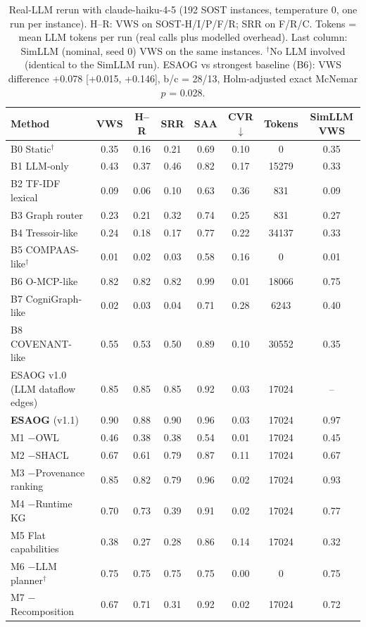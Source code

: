 \begin{table}[H]
\centering
\caption{Real-LLM rerun with claude-haiku-4-5 (192 SOST instances, temperature 0, one run per instance). H--R: VWS on SOST-H/I/P/F/R; SRR on F/R/C. Tokens = mean LLM tokens per run (real calls plus modelled overhead). Last column: SimLLM (nominal, seed 0) VWS on the same instances. $^\dagger$No LLM involved (identical to the SimLLM run). ESAOG vs strongest baseline (B6): VWS difference +0.078 [+0.015, +0.146], b/c = 28/13, Holm-adjusted exact McNemar $p$ = 0.028.}
\label{tab:real_claude-haiku-4-5}
\scriptsize
\begin{tabular}{lccccccc}
\toprule
Method & VWS & H--R & SRR & SAA & CVR$\downarrow$ & Tokens & SimLLM VWS\\
\midrule
B0 Static$^\dagger$ & 0.35 & 0.16 & 0.21 & 0.69 & 0.10 & 0 & 0.35\\
B1 LLM-only & 0.43 & 0.37 & 0.46 & 0.82 & 0.17 & 15279 & 0.33\\
B2 TF-IDF lexical & 0.09 & 0.06 & 0.10 & 0.63 & 0.36 & 831 & 0.09\\
B3 Graph router & 0.23 & 0.21 & 0.32 & 0.74 & 0.25 & 831 & 0.27\\
B4 Tressoir-like & 0.24 & 0.18 & 0.17 & 0.77 & 0.22 & 34137 & 0.33\\
B5 COMPAAS-like$^\dagger$ & 0.01 & 0.02 & 0.03 & 0.58 & 0.16 & 0 & 0.01\\
B6 O-MCP-like & 0.82 & 0.82 & 0.82 & 0.99 & 0.01 & 18066 & 0.75\\
B7 CogniGraph-like & 0.02 & 0.03 & 0.04 & 0.71 & 0.28 & 6243 & 0.40\\
B8 COVENANT-like & 0.55 & 0.53 & 0.50 & 0.89 & 0.10 & 30552 & 0.35\\
ESAOG v1.0 (LLM dataflow edges) & 0.85 & 0.85 & 0.85 & 0.92 & 0.03 & 17024 & --\\
\textbf{ESAOG} (v1.1) & 0.90 & 0.88 & 0.90 & 0.96 & 0.03 & 17024 & 0.97\\
M1 $-$OWL & 0.46 & 0.38 & 0.38 & 0.54 & 0.01 & 17024 & 0.45\\
M2 $-$SHACL & 0.67 & 0.61 & 0.79 & 0.87 & 0.11 & 17024 & 0.67\\
M3 $-$Provenance ranking & 0.85 & 0.82 & 0.79 & 0.96 & 0.02 & 17024 & 0.93\\
M4 $-$Runtime KG & 0.70 & 0.73 & 0.39 & 0.91 & 0.02 & 17024 & 0.77\\
M5 Flat capabilities & 0.38 & 0.27 & 0.28 & 0.86 & 0.14 & 17024 & 0.32\\
M6 $-$LLM planner$^\dagger$ & 0.75 & 0.75 & 0.75 & 0.75 & 0.00 & 0 & 0.75\\
M7 $-$Recomposition & 0.67 & 0.71 & 0.31 & 0.92 & 0.02 & 17024 & 0.72\\
\bottomrule
\end{tabular}
\end{table}
